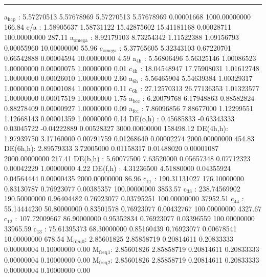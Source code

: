 \documentclass[11pt]{article}
\begin{document}
\noindent\rule{\textwidth}{0.5pt}
a\(_{\text{hcp}}\)   :   5.57270513   5.57678969   5.57270513   5.57678969   0.00001668 1000.00000000       166.84
c/a     :   1.58905637   1.58731122  15.42875602  15.41181168   0.00028711 100.00000000       287.11
a\(_{\text{omega}}\) :   8.92179103   8.73254342   1.11522388   1.09156793   0.00055960  10.00000000        55.96
c\(_{\text{omega}}\) :   5.37765605   5.32343103   0.67220701   0.66542888   0.00004594  10.00000000         4.59
a\(_{\text{4h}}\)    :   5.56806496   5.56325146   1.00086523   1.00000000   0.00000075   1.00000000         0.01
c\(_{\text{4h}}\)    :  18.04548947  17.75908031   1.01612748   1.00000000   0.00026010   1.00000000         2.60
a\(_{\text{6h}}\)    :   5.56465904   5.54639384   1.00329317   1.00000000   0.00001084   1.00000000         0.11
c\(_{\text{6h}}\)    :  27.12570313  26.77136353   1.01323577   1.00000000   0.00017519   1.00000000         1.75
a\(_{\text{bcc}}\)   :   6.20079768   6.17948863   0.88582824   0.88278409   0.00000927   1.00000000         0.09
a\(_{\text{fcc}}\)   :   7.86096856   7.88677000   1.12299551   1.12668143   0.00001359   1.00000000         0.14
DE(o,h) :   0.45685833  -0.63343333   0.03045722  -0.04222889   0.00528327 3000.00000000    158498.12
DE(4h,h):   1.97939750   3.17160000   0.00791759   0.01268640   0.00002274 2000.00000000       454.83
DE(6h,h):   2.89579333   3.72005000   0.01158317   0.01488020   0.00001087 2000.00000000       217.41
DE(b,h) :   5.60077500   7.63520000   0.05657348   0.07712323   0.00042229   1.00000000         4.22
DE(f,h) :   4.31236500   4.51880000   0.04355924   0.04564444   0.00000435 2000.00000000        86.96
c\(_{\text{11}}\)    : 190.31131027 176.10000000   0.83130787   0.76923077   0.00385357 100.00000000      3853.57
c\(_{\text{33}}\)    : 238.74569902 190.50000000   0.96404482   0.76923077   0.03795251 100.00000000     37952.51
c\(_{\text{44}}\)    :  55.14444230  50.80000000   0.83501578   0.76923077   0.00432767 100.00000000      4327.67
c\(_{\text{12}}\)    : 107.72009667  86.90000000   0.95352834   0.76923077   0.03396559 100.00000000     33965.59
c\(_{\text{13}}\)    :  75.61395373  68.30000000   0.85160439   0.76923077   0.00678541  10.00000000       678.54
M\(_{\text{freq}}\)\(_{\text{0}}\):   2.85601825   2.85858719   0.20814611   0.20833333   0.00000004   0.10000000         0.00
M\(_{\text{freq}}\)\(_{\text{1}}\):   2.85601826   2.85858719   0.20814611   0.20833333   0.00000004   0.10000000         0.00
M\(_{\text{freq}}\)\(_{\text{2}}\):   2.85601826   2.85858719   0.20814611   0.20833333   0.00000004   0.10000000         0.00
\end{document}
